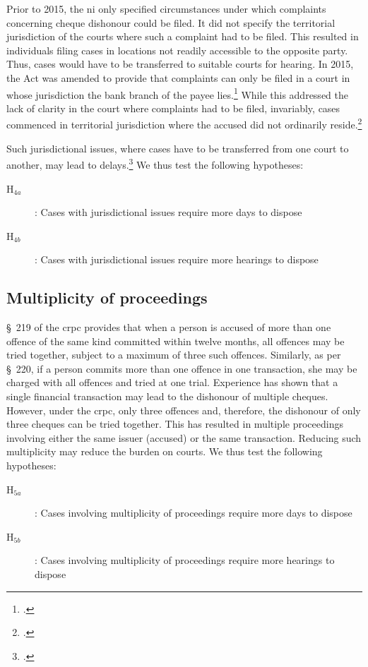 Prior to 2015, the \gls{ni} only specified circumstances under which complaints concerning cheque dishonour could be filed. It did not specify the territorial jurisdiction of the courts where such a complaint had to be filed. This resulted in individuals filing cases in locations not readily accessible to the opposite party. Thus, cases would have to be transferred to suitable courts for hearing. In 2015, the Act was amended to provide that complaints can only be filed in a court in whose jurisdiction the bank branch of the payee lies.\footcite{niAmend2015} While this addressed the lack of clarity in the court where complaints had to be filed, invariably, cases commenced in territorial jurisdiction where the accused did not ordinarily reside.\footcite{amicus2020_submission}

Such jurisdictional issues, where cases have to be transferred from one court to another, may lead to delays.\footcite{sc2020_138, amicus2020_submission} We thus test the following hypotheses:

\begin{description}
\item[H$_{4a}$] : Cases with jurisdictional issues require more days to dispose
\item[H$_{4b}$] : Cases with jurisdictional issues require more hearings to dispose
\end{description}

\subsection{Multiplicity of proceedings}

\S~219 of the \gls{crpc} provides that when a person is accused of more than one offence of the same kind committed within twelve months, all offences may be tried together, subject to a maximum of three such offences. Similarly, as per \S~220, if a person commits more than one offence in one transaction, she may be charged with all offences and tried at one trial. Experience has shown that a single financial transaction may lead to the dishonour of multiple cheques. However, under the \gls{crpc}, only three offences and, therefore, the dishonour of only three cheques can be tried together. This has resulted in multiple proceedings involving either the same issuer (accused) or the same transaction. Reducing such multiplicity may reduce the burden on courts. We thus test the following hypotheses:

\begin{description}
\item[H$_{5a}$] : Cases involving multiplicity of proceedings require more days to dispose
\item[H$_{5b}$] : Cases involving multiplicity of proceedings require more hearings to dispose
\end{description}   

